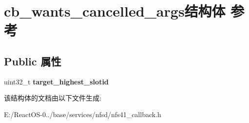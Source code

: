 \hypertarget{structcb__wants__cancelled__args}{}\section{cb\+\_\+wants\+\_\+cancelled\+\_\+args结构体 参考}
\label{structcb__wants__cancelled__args}
\subsection*{Public 属性}
\begin{DoxyCompactItemize}
\item 
\mbox{\label{structcb__wants__cancelled__args_ac14936ecd15238f691073d75556a59a8}} 
uint32\+\_\+t {\bfseries target\+\_\+highest\+\_\+slotid}
\end{DoxyCompactItemize}


该结构体的文档由以下文件生成\+:\begin{DoxyCompactItemize}
\item 
E\+:/\+React\+O\+S-\/0../base/services/nfsd/nfs41\+\_\+callback.\+h\end{DoxyCompactItemize}
